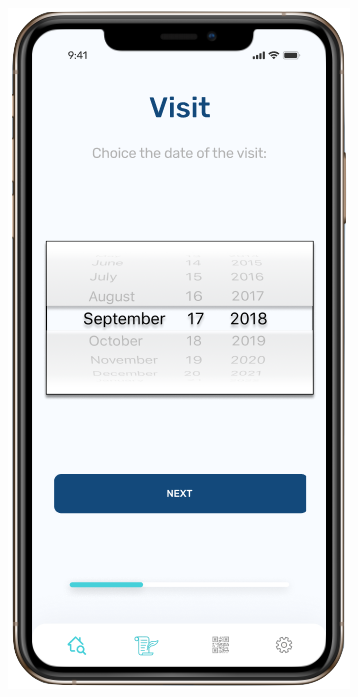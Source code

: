 \begin{figure}[H]
\begin{center}
{           \includegraphics[scale=0.35]{images/mockup/visit1.png}
        }\\ %
\end{center}
\end{figure}
